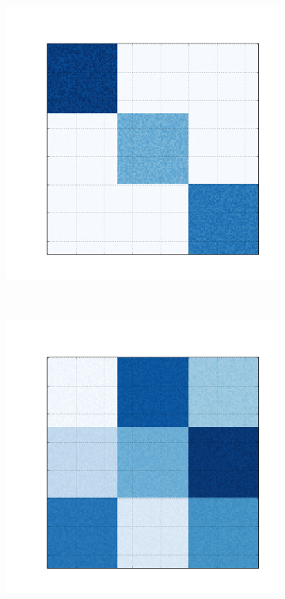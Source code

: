 \documentclass[
    12pt,                %
    oneside,            %
    a4paper,            %
    english,            %
    brazil                %
    ]{abntex2ppgsi}
\begin{document}
\begin{figure} [htpb]
\begin{subfigure}[b]{0.18\textwidth}
        \includegraphics[width=\textwidth]{img/b-bic-structure.png}
        \caption{}
        \label{fig:bic-syntetic-structure:b}
    \end{subfigure}
    ~
    \begin{subfigure}[b]{0.18\textwidth}
        \includegraphics[width=\textwidth]{img/c-bic-structure.png}

\end{subfigure}
\end{figure}
\end{document}
